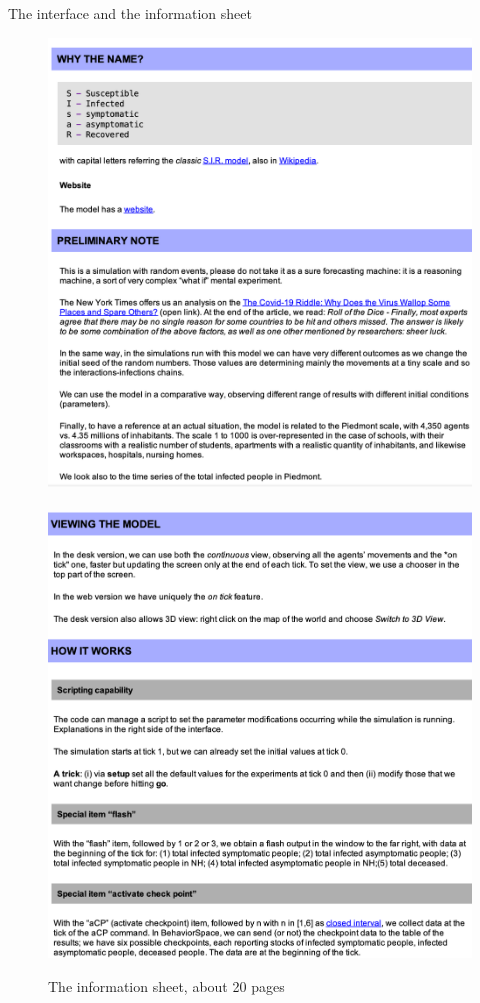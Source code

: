 \documentclass[8pt]{beamer}
\begin{document}
\begin{frame}{The interface and the information sheet}

\begin{figure}[H]
\center
\includegraphics[scale=0.23]{info1b.png}~~~\includegraphics[scale=0.23]{info2b.png}

\caption{The information sheet, about  20 pages} 
\label{interface}
\end{figure}

\end{frame}
\end{document}
